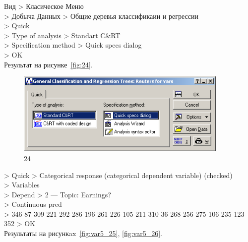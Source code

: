 Вид > Класическое Меню \\
> Добыча Данных > Общие деревья классификаии и регрессии \\
> Quick \\
> Type of analysis > Standart C\&RT \\
> Specification method > Quick specs dialog \\
> OK \\

Результат на рисунке~\ref{fig:24}.

\begin{figure}[!h]
  \centering

  \includegraphics[height=4cm]
  {inc/var5/24.PNG}

  \caption{24}

  \label{fig:var5_24}
\end{figure}

\newpage

> Quick > Categorical response (categorical dependent variable) (checked) \\
> Variables \\
> Depend > 2 — Topic: Earnings? \\
> Continuous pred\\
> 346 87 309 221 292 286 196 261 226 105 211 310 36 268 256 275 106 235 123 352 > OK\\

Результаты на рисункax~\ref{fig:var5_25}, \ref{fig:var5_26}.

